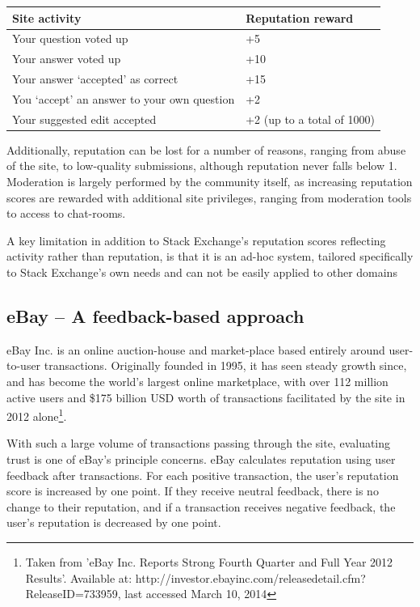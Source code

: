\documentclass[]{final_report}
\begin{document}
\begin{minipage}{\linewidth}
\centering
\begin{tabular}{|l|l|}
\hline \textbf{Site activity} & \textbf{Reputation reward} \\ 
\hline Your question voted up & +5 \\ 
\hline Your answer voted up & +10 \\ 
\hline Your answer `accepted' as correct & +15 \\ 
\hline You `accept' an answer to your own question & +2 \\ 
\hline Your suggested edit accepted & +2 (up to a total of 1000) \\ 
\hline 
\end{tabular}\par
{} \label{tab:serep}
\end{minipage}


Additionally, reputation can be lost for a number of reasons, ranging from abuse of the site, to low-quality submissions, although reputation never falls below 1. Moderation is largely performed by the community itself, as increasing reputation scores are rewarded with additional site privileges, ranging from moderation tools to access to chat-rooms.

A key limitation in addition to Stack Exchange's reputation scores reflecting activity rather than reputation, is that it is an ad-hoc system, tailored specifically to Stack Exchange's own needs and can not be easily applied to other domains

\subsection{eBay -- A feedback-based approach}

eBay Inc. is an online auction-house and market-place based entirely around user-to-user transactions. Originally founded in 1995, it has seen steady growth since, and has become the world's largest online marketplace, with over 112 million active users and \$175 billion USD worth of transactions facilitated by the site in 2012 alone\footnote{Taken from 'eBay Inc. Reports Strong Fourth Quarter and Full Year 2012 Results'. Available at: http://investor.ebayinc.com/releasedetail.cfm?ReleaseID=733959, last accessed March 10, 2014}.

With such a large volume of transactions passing through the site, evaluating trust is one of eBay's principle concerns. eBay calculates reputation using user feedback after transactions. For each positive transaction, the user's reputation score is increased by one point. If they receive neutral feedback, there is no change to their reputation, and if a transaction receives negative feedback, the user's reputation is decreased by one point.
\end{document}
